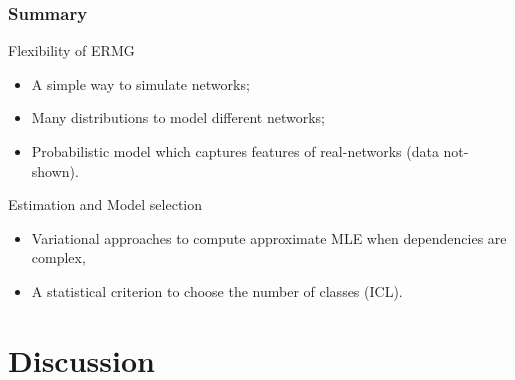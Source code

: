 \documentclass{beamer}
\begin{document}
\begin{frame}
  \frametitle<presentation>{Summary}

  \begin{block}{Flexibility of ERMG}
  \begin{itemize}
  \item A simple way to simulate networks;
  \item Many distributions to model different networks;
  \item Probabilistic model which captures features of real-networks (data
  not-shown).
  \end{itemize}
  \end{block}

  \begin{block}{Estimation and Model selection}
  \begin{itemize}
  \item Variational approaches to compute approximate MLE when
  dependencies are complex,
  \item A statistical criterion to choose the number of classes
  (ICL).
  \end{itemize}
  \end{block}

\end{frame}


\section*{Discussion}
\end{document}
